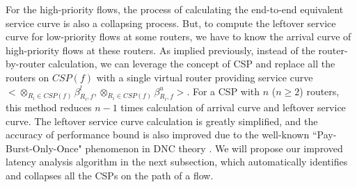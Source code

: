 \documentclass[10pt,journal]{IEEEtran}
\begin{document}
For the high-priority flows, the process of calculating the end-to-end equivalent service curve is also a collapsing process. But, to compute the leftover service curve for low-priority flows at some routers, we have to know the arrival curve of high-priority flows at these routers. As implied previously, instead of the router-by-router calculation, we can leverage the concept of CSP and replace all the routers on $CSP(f)$ with a single virtual router providing service curve $<\otimes_{R_i\in CSP(f)}\beta_{R_i,f}^l,\otimes_{R_i\in CSP(f)}\beta_{R_i,f}^u>$. For a CSP with $n$ ($n\geq 2$) routers, this method reduces $n-1$ times calculation of arrival curve and leftover service curve. The leftover service curve calculation is greatly simplified, and the accuracy of performance bound is also improved due to the well-known ``Pay-Burst-Only-Once" phenomenon in DNC theory \cite{Boudec2001Network}. We will propose our improved latency analysis algorithm in the next subsection, which automatically identifies and collapses all the CSPs on the path of a flow.
\end{document}
